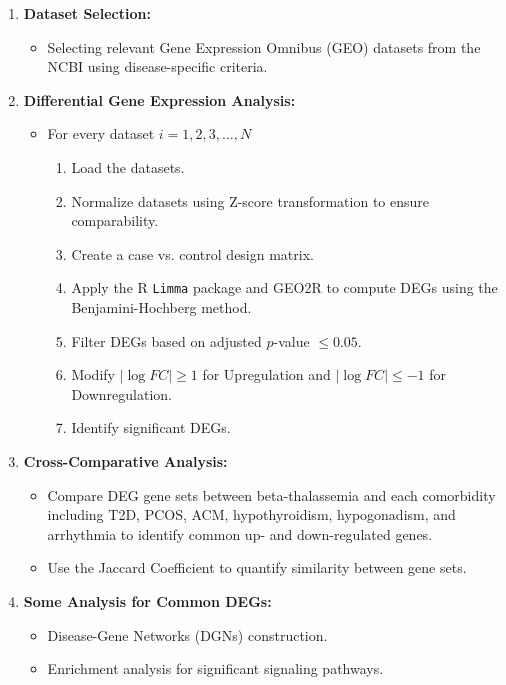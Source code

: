 \begin{enumerate}
    \item \textbf{Dataset Selection:}
    \begin{itemize}
        \item Selecting relevant Gene Expression Omnibus (GEO) datasets from the NCBI using disease-specific criteria.
    \end{itemize}
    \item \textbf{Differential Gene Expression Analysis:}
    \begin{itemize}
        \item For every dataset \( i = 1, 2, 3, \ldots, N \)
        \begin{enumerate}
            \item Load the datasets.
            \item Normalize datasets using Z-score transformation to ensure comparability.
            \item Create a case vs. control design matrix.
            \item Apply the R \texttt{Limma} package and GEO2R to compute DEGs using the Benjamini-Hochberg method.
            \item Filter DEGs based on adjusted \( p \)-value \( \leq 0.05 \).
            \item Modify \( |\log FC| \geq 1 \) for Upregulation and \( |\log FC| \leq -1 \) for Downregulation.
            \item Identify significant DEGs.
        \end{enumerate}
    \end{itemize}
    \item \textbf{Cross-Comparative Analysis:}
    \begin{itemize}
        \item Compare DEG gene sets between beta-thalassemia and each comorbidity including T2D, PCOS, ACM, hypothyroidism, hypogonadism, and arrhythmia to identify common up- and down-regulated genes.
        \item Use the Jaccard Coefficient to quantify similarity between gene sets.
    \end{itemize}
    \item \textbf{Some Analysis for Common DEGs:}
    \begin{itemize}
        \item Disease-Gene Networks (DGNs) construction.
        \item Enrichment analysis for significant signaling pathways.

\end{itemize}
\end{enumerate}
